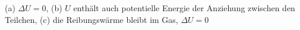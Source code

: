 (a) $\Delta U = 0$, (b) $U$ enthält auch potentielle Energie der Anziehung zwischen den Teilchen, (c) die Reibungswärme bleibt im Gas, $\Delta U = 0$
